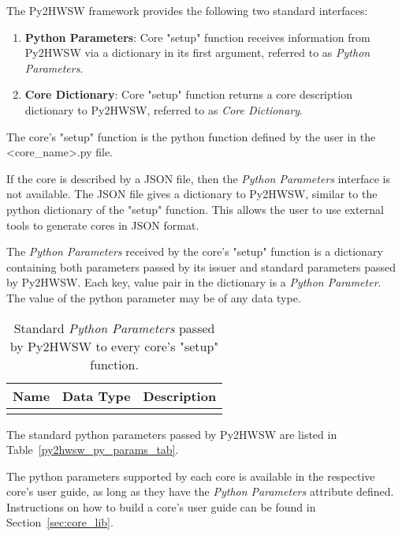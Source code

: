 %

The Py2HWSW framework provides the following two standard interfaces:
\begin{enumerate}
  \item \textbf{Python Parameters}: Core "setup" function receives information from Py2HWSW via a dictionary in its first argument, referred to as \textit{Python Parameters}.
  \item \textbf{Core Dictionary}: Core "setup" function returns a core description dictionary to Py2HWSW, referred to as \textit{Core Dictionary}.
\end{enumerate}

The core's "setup" function is the python function defined by the user in the <core\_name>.py file.

If the core is described by a JSON file, then the \textit{Python Parameters} interface is not available.
The JSON file gives a dictionary to Py2HWSW, similar to the python dictionary of the "setup" function.
This allows the user to use external tools to generate cores in JSON format.

%
%

The \textit{Python Parameters} received by the core's "setup" function is a dictionary containing both parameters passed by its issuer and standard parameters passed by Py2HWSW.
Each key, value pair in the dictionary is a \textit{Python Parameter}.
The value of the python parameter may be of any data type.

\begin{xltabular}{\textwidth}{|l|l|X|}

  \hline
  {\bf Name} & {\bf Data Type} & {\bf Description}  \\ \hline \hline

  

  \caption{Standard \textit{Python Parameters} passed by Py2HWSW to every core's "setup" function.}
\end{xltabular}
\label{py2hwsw_py_params_tab}

The standard python parameters passed by Py2HWSW are listed in Table~\ref{py2hwsw_py_params_tab}.

The python parameters supported by each core is available in the respective core's user guide, as long as they have the \textit{Python Parameters} attribute defined.
Instructions on how to build a core's user guide can be found in Section~\ref{sec:core_lib}. 


